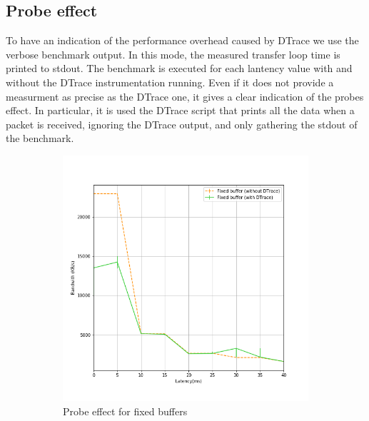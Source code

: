 \documentclass[a4paper,10pt]{article}
\begin{document}
\subsection{Probe effect}

To have an indication of the performance overhead caused by DTrace we use the verbose benchmark output. In this mode, the measured transfer loop time is printed to stdout. The benchmark is executed for each lantency value with and without the DTrace instrumentation running. Even if it does not provide a measurment as precise as the DTrace one, it gives a clear indication of the probes effect.
In particular, it is used the DTrace script that prints all the data when a packet is received, ignoring the DTrace output, and only gathering the stdout of the benchmark.

\begin{figure}[]
\begin{subfigure}{0.5\textwidth}
   \centering
   \includegraphics[width=\textwidth]{images/fixed_probe_effect.png}
   \caption{Probe effect for fixed buffers}
   \label{fig:fixed_probe}
\end{subfigure}
\qquad
\begin{subfigure}{0.5\textwidth}
   \centering

\end{subfigure}
\end{figure}
\end{document}
